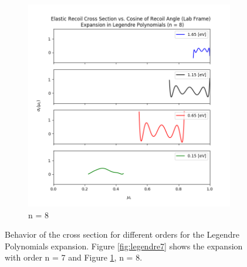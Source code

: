 \documentclass[review]{elsarticle}
\begin{document}
\begin{figure}
\begin{subfigure}[h]{0.5\linewidth}
		\includegraphics[width=\linewidth]{H_simple_plot_l8}
		\caption{n = 8}
		\label{fig:legendre8}
	\end{subfigure}%
	\caption{Behavior of the cross section for different orders for the Legendre Polynomials expansion. Figure \ref{fig:legendre7} shows the expansion with order n = 7 and 		Figure \ref{fig:legendre8}, n = 8. }
	\label{fig:legendre}
\end{figure}


%
\end{document}
